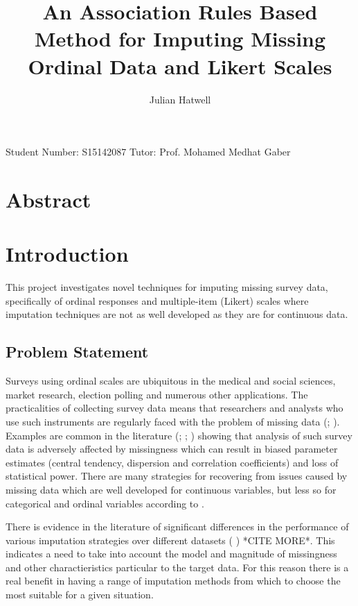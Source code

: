 \documentclass[a4paper]{article}\usepackage{knitr}
\newcommand{\subtitle}[1]{%
  \posttitle{%
    \par\end{center}
    \begin{center}\large#1\end{center}
    \vskip0.5em}%
}
\begin{document}
\title{An Association Rules Based Method for Imputing Missing Ordinal Data and Likert Scales}
\subtitle{Proposal for Master's Dissertation}
\author{Julian Hatwell}
\maketitle

Student Number: S15142087\newline
Tutor: Prof. Mohamed Medhat Gaber

\tableofcontents

\section{Abstract}

\section{Introduction}

This project investigates novel techniques for imputing missing survey data, specifically of ordinal responses and multiple-item (Likert) scales where imputation techniques are not as well developed as they are for continuous data.

\subsection{Problem Statement}

Surveys using ordinal scales are ubiquitous in the medical and social sciences, market research, election polling and numerous other applications. The practicalities of collecting survey data means that researchers and analysts who use such instruments are regularly faced with the problem of missing data (\cite{bono2007missing}; \cite{kamakura2000factor}). Examples are common in the literature (\cite{madow1983incomplete}; \cite{roth1999missing}; \cite{raaijmakers1999effectiveness}) showing that analysis of such survey data is adversely affected by missingness which can result in biased parameter estimates (central tendency, dispersion and correlation coefficients) and loss of statistical power. There are many strategies for recovering from issues caused by missing data which are well developed for continuous variables, but less so for categorical and ordinal variables according to \cite{finch2010imputation}.\newline 

There is evidence in the literature of significant differences in the performance of various imputation strategies over different datasets (\cite{wu2015comparison} ) *CITE MORE*. This indicates a need to take into account the model and magnitude of missingness and other charactieristics particular to the target data. For this reason there is a real benefit in having a range of imputation methods from which to choose the most suitable for a given situation.\newline
\end{document}
